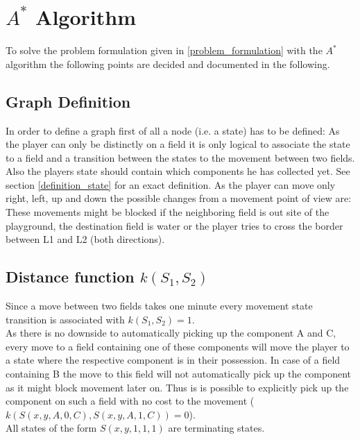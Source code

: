 \documentclass{article}
\begin{document}
\section{$A^*$ Algorithm}
To solve the problem formulation given in \ref{problem_formulation} with the $A^*$ algorithm the following points are decided and documented in the following.
\begin{comment}
\begin{itemize}
    \item Development of an graph
        \begin{itemize}
            \item What state does a node describe
            \item Set of terminating nodes
        \end{itemize}
    \item Distance function for the graph $k(S_1, S_2)$
    \item Estimation function $h(S)$
\end{itemize}
\end{comment}

\subsection{Graph Definition}
In order to define a graph first of all a node (i.e. a state) has to be defined: As the player can only be distinctly on a field it is only logical to associate the state to a field and a transition between the states to the movement between two fields. Also the players state should contain which components he has collected yet. See section \ref{definition_state} for an exact definition. As the player can move only right, left, up and down the possible changes from a movement point of view are:
These movements might be blocked if the neighboring field is out site of the playground, the destination field is water or the player tries to cross the border between L1 and L2 (both directions).
\subsection{Distance function  $k(S_1, S_2)$}
Since a move between two fields takes one minute every movement state transition is associated with $k(S_1, S_2) = 1$.\\
As there is no downside to automatically picking up the component A and C, every move to a field containing one of these components will move the player to a state where the respective component is in their possession. In case of a field containing B the move to this field will not automatically pick up the component as it might block movement later on. Thus is is possible to explicitly pick up the component on such a field with no cost to the movement ($k(S(x,y,A,0,C), S(x,y,A,1,C)) = 0$).\\
All states of the form $S(x,y,1,1,1)$ are terminating states.
\end{document}
